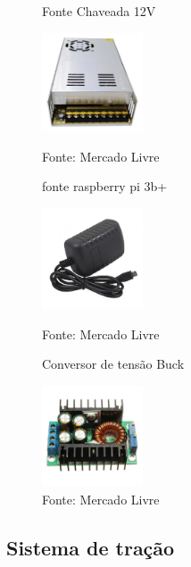\documentclass[../poliXuniversity_hospital_(USP)_report.tex]{subfiles}
\begin{document}
\begin{figure}[h!]
\centering
    \begin{minipage}{0.3\textwidth}
        \centering
        \caption{Fonte Chaveada 12V}
        \centering %
        \includegraphics[width=3cm]{images/fonte-chaveada.jpg}
        \caption*{Fonte: Mercado Livre}
        \label{figura: Fonte Chaveada 12V}
        
    \end{minipage}\hfill
    \begin{minipage}{0.3\textwidth}
    
        \centering
        \caption{fonte raspberry pi 3b+}
        \centering %
        \includegraphics[width=3cm]{images/fonte_rasp.jpg}
        \caption*{Fonte: Mercado Livre}
        \label{figura: fonte raspberry pi 3b+}
        
    \end{minipage}\hfill
    \begin{minipage}{0.3\textwidth}
        \centering
        \caption{Conversor de tensão Buck}
        \centering %
        \includegraphics[width=3cm]{images/conversor.jpg}
        \caption*{Fonte: Mercado Livre}
        \label{figura: Conversor de tensão}
        
    \end{minipage}\hfill
\end{figure}
\subsection{Sistema de tração}
\end{document}
